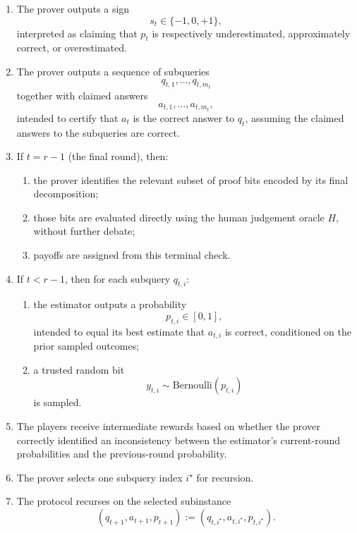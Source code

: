 \documentclass[11pt]{article}
\begin{document}
\begin{definition}
\begin{enumerate}
    \item The prover outputs a sign
    \[
    s_t \in \{-1,0,+1\},
    \]
    interpreted as claiming that \(p_t\) is respectively underestimated, approximately correct, or overestimated.

    \item The prover outputs a sequence of subqueries
    \[
    q_{t,1},\dots,q_{t,m_t}
    \]
    together with claimed answers
    \[
    a_{t,1},\dots,a_{t,m_t},
    \]
    intended to certify that \(a_t\) is the correct answer to \(q_t\), assuming the claimed answers to the subqueries are correct.

    \item If \(t=r-1\) (the final round), then:
    \begin{enumerate}
        \item the prover identifies the relevant subset of proof bits encoded by its final decomposition;
        \item those bits are evaluated directly using the human judgement oracle \(H\), without further debate;
        \item payoffs are assigned from this terminal check.
    \end{enumerate}

    \item If \(t < r-1\), then for each subquery \(q_{t,i}\):
    \begin{enumerate}
        \item the estimator outputs a probability
        \[
        p_{t,i} \in [0,1],
        \]
        intended to equal its best estimate that \(a_{t,i}\) is correct, conditioned on the prior sampled outcomes;
        \item a trusted random bit
        \[
        y_{t,i} \sim \mathrm{Bernoulli}(p_{t,i})
        \]
        is sampled.
    \end{enumerate}

    \item The players receive intermediate rewards based on whether the prover correctly identified an inconsistency between the estimator's current-round probabilities and the previous-round probability.

    \item The prover selects one subquery index \(i^\star\) for recursion.

    \item The protocol recurses on the selected subinstance
    \[
    (q_{t+1}, a_{t+1}, p_{t+1}) := (q_{t,i^\star}, a_{t,i^\star}, p_{t,i^\star}).
    \]
\end{enumerate}
\end{definition}
\end{document}
